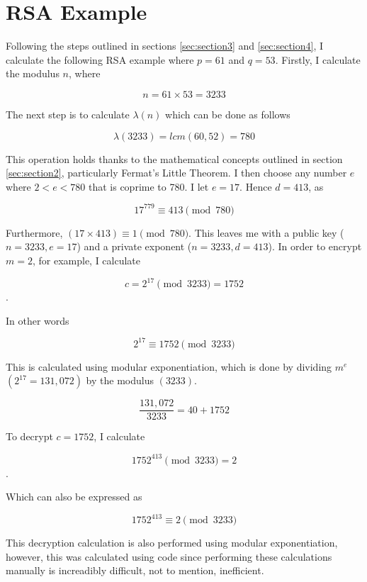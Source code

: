 \section{RSA Example}\label{sec:section5}

Following the steps outlined in sections \ref{sec:section3} and \ref{sec:section4}, I calculate the following RSA example where $p=61$ and $q=53$. Firstly, I calculate the modulus $n$, where

$$n = 61 \times 53 = 3233$$

The next step is to calculate $\lambda(n)$ which can be done as follows

$$\lambda (3233) = lcm (60,52) = 780$$

This operation holds thanks to the mathematical concepts outlined in section \ref{sec:section2}, particularly Fermat's Little Theorem.
I then choose any number $e$ where $2 < e < 780$ that is coprime to 780. I let $e=17$.
Hence $d=413$, as 

$$
17^{779} \equiv 413 \pmod{780}
$$

Furthermore, $(17 \times 413) \equiv 1 \pmod{780}$. This leaves me with a public key ($n = 3233, e = 17$) and a private exponent ($n = 3233, d = 413$). In order to encrypt $m=2$, for example, I calculate

$$c = 2^{17} \pmod{3233} = 1752$$.

In other words

$$2^{17} \equiv 1752 \pmod{3233}$$

This is calculated using modular exponentiation, which is done by dividing $m^e$ $(2^{17} = 131,072)$ by the modulus $(3233)$.

$$
\frac{131,072}{3233} = 40 + 1752
$$

To decrypt $c = 1752$, I calculate

$$1752^{413} \pmod{3233} = 2$$.

Which can also be expressed as

$$1752^{413} \equiv 2 \pmod{3233}$$

This decryption calculation is also performed using modular exponentiation, however, this was calculated using code since performing these calculations manually is increadibly difficult, not to mention, inefficient.

